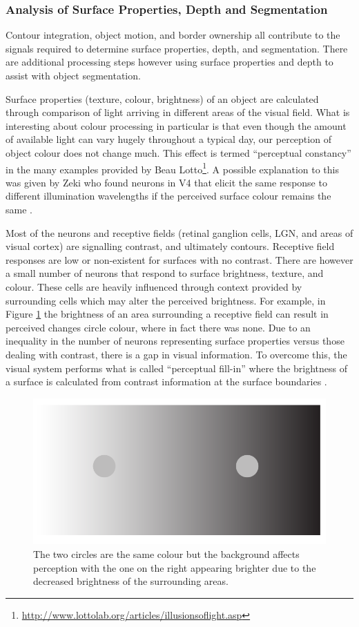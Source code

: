 \subsubsection{Analysis of Surface Properties, Depth and Segmentation}
Contour integration, object motion, and border ownership all contribute to the signals required to determine surface properties, depth, and segmentation. 
There are additional processing steps however using surface properties and depth to assist with object segmentation.

Surface properties (texture, colour, brightness) of an object are calculated through comparison of light arriving in different areas of the visual field. 
What is interesting about colour processing in particular is that even though the amount of available light can vary hugely throughout a typical day, our perception of object colour does not change much. 
This effect is termed ``perceptual constancy'' in the many examples provided by Beau Lotto\footnote{\url{http://www.lottolab.org/articles/illusionsoflight.asp}}. 
A possible explanation to this was given by Zeki who found neurons in V4 that elicit the same response to different illumination wavelengths if the perceived surface colour remains the same \cite{Zeki1983767}. 

Most of the neurons and receptive fields (retinal ganglion cells, LGN, and areas of visual cortex) are signalling contrast, and ultimately contours. 
Receptive field responses are low or non-existent for surfaces with no contrast. 
There are however a small number of neurons that respond to surface brightness, texture, and colour. 
These cells are heavily influenced through context provided by surrounding cells which may alter the perceived brightness. 
For example, in Figure \ref{fig:brightness-change} the brightness of an area surrounding a receptive field can result in perceived changes circle colour, where in fact there was none.
Due to an inequality in the number of neurons representing surface properties versus those dealing with contrast, there is a gap in visual information. 
To overcome this, the visual system performs what is called ``perceptual fill-in'' where the brightness of a surface is calculated from contrast information at the surface boundaries \cite{kandel2012principles}.

\begin{figure}[t!]
\centering
\includegraphics[width=.6\textwidth]{images/related-work/brightness-illusion}
\caption{The two circles are the same colour but the background affects perception with the one on the right appearing brighter due to the decreased brightness of the surrounding areas.}
\label{fig:brightness-change}
\end{figure}

